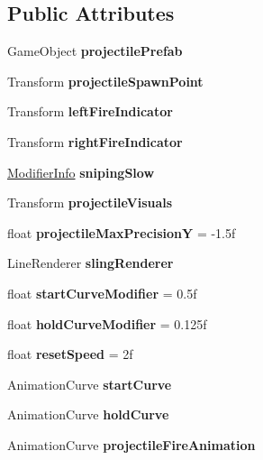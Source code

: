 \subsection*{Public Attributes}
\begin{DoxyCompactItemize}
\item 
\hypertarget{class_slingshot_a4c84db71437e8fba09732f8bc73a4c80}{}\label{class_slingshot_a4c84db71437e8fba09732f8bc73a4c80} 
Game\+Object {\bfseries projectile\+Prefab}
\item 
\hypertarget{class_slingshot_a8a1c9bb20e939df7822305ea7a819640}{}\label{class_slingshot_a8a1c9bb20e939df7822305ea7a819640} 
Transform {\bfseries projectile\+Spawn\+Point}
\item 
\hypertarget{class_slingshot_a78d975c4344951550af71ca64e382417}{}\label{class_slingshot_a78d975c4344951550af71ca64e382417} 
Transform {\bfseries left\+Fire\+Indicator}
\item 
\hypertarget{class_slingshot_ab150fb4197b2d055ea8137f96d5d2ee8}{}\label{class_slingshot_ab150fb4197b2d055ea8137f96d5d2ee8} 
Transform {\bfseries right\+Fire\+Indicator}
\item 
\hypertarget{class_slingshot_a5334002ee993f7edae136b5db5e42300}{}\label{class_slingshot_a5334002ee993f7edae136b5db5e42300} 
\hyperlink{struct_modifier_info}{Modifier\+Info} {\bfseries sniping\+Slow}
\item 
\hypertarget{class_slingshot_a282740cdda226846211c0e173f76c8fa}{}\label{class_slingshot_a282740cdda226846211c0e173f76c8fa} 
Transform {\bfseries projectile\+Visuals}
\item 
\hypertarget{class_slingshot_ad0149b5247102c568d5ff8e3349cc1a8}{}\label{class_slingshot_ad0149b5247102c568d5ff8e3349cc1a8} 
float {\bfseries projectile\+Max\+PrecisionY} = -\/1.\+5f
\item 
\hypertarget{class_slingshot_a115a5b40962f64c3442ad49a47e2899f}{}\label{class_slingshot_a115a5b40962f64c3442ad49a47e2899f} 
Line\+Renderer {\bfseries sling\+Renderer}
\item 
\hypertarget{class_slingshot_a24f813a0a5ae2507b01c0003b3765ba7}{}\label{class_slingshot_a24f813a0a5ae2507b01c0003b3765ba7} 
float {\bfseries start\+Curve\+Modifier} = 0.\+5f
\item 
\hypertarget{class_slingshot_a9cf4327e9ab4c50416fe468014de81ef}{}\label{class_slingshot_a9cf4327e9ab4c50416fe468014de81ef} 
float {\bfseries hold\+Curve\+Modifier} = 0.\+125f
\item 
\hypertarget{class_slingshot_a864ec5b4cee36b5f5c7687d9b9fb73a3}{}\label{class_slingshot_a864ec5b4cee36b5f5c7687d9b9fb73a3} 
float {\bfseries reset\+Speed} = 2f
\item 
\hypertarget{class_slingshot_a94f25a2e95d5880652d392a33e764015}{}\label{class_slingshot_a94f25a2e95d5880652d392a33e764015} 
Animation\+Curve {\bfseries start\+Curve}
\item 
\hypertarget{class_slingshot_a444f0da3951c2b82807da28138b33594}{}\label{class_slingshot_a444f0da3951c2b82807da28138b33594} 
Animation\+Curve {\bfseries hold\+Curve}
\item 
\hypertarget{class_slingshot_a78f0f329943fd59ba5d7794a8db98b53}{}\label{class_slingshot_a78f0f329943fd59ba5d7794a8db98b53} 
Animation\+Curve {\bfseries projectile\+Fire\+Animation}
\end{DoxyCompactItemize}
